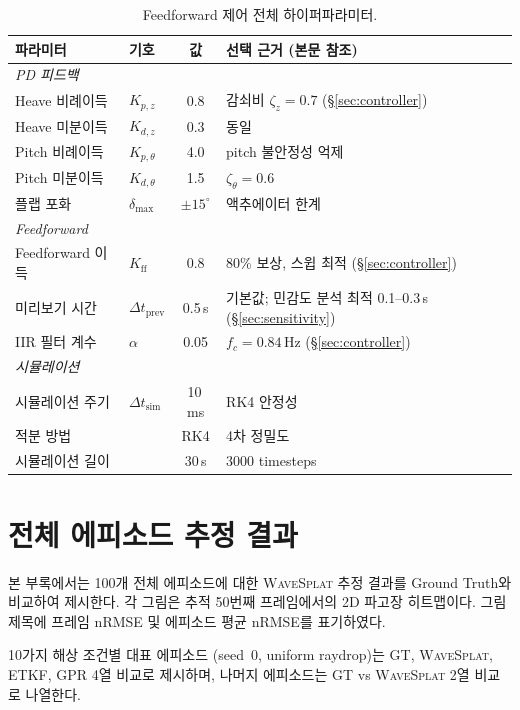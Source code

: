 \documentclass[11pt]{report}
\numberwithin{equation}{chapter}
\numberwithin{figure}{chapter}
\numberwithin{table}{chapter}
\newcommand{\WS}{\textsc{WaveSplat}}
\begin{document}
\begin{table}[htbp]
\centering
\caption{Feedforward 제어 전체 하이퍼파라미터.}
\label{tab:ff_hyperparams}
\small
\begin{tabular}{llcp{4.8cm}}
\toprule
파라미터 & 기호 & 값 & 선택 근거 (본문 참조) \\
\midrule
\multicolumn{4}{l}{\textit{PD 피드백}} \\
Heave 비례이득 & $K_{p,z}$ & 0.8 & 감쇠비 $\zeta_z=0.7$ (\S\ref{sec:controller}) \\
Heave 미분이득 & $K_{d,z}$ & 0.3 & 동일 \\
Pitch 비례이득 & $K_{p,\theta}$ & 4.0 & pitch 불안정성 억제 \\
Pitch 미분이득 & $K_{d,\theta}$ & 1.5 & $\zeta_\theta=0.6$ \\
플랩 포화 & $\delta_{\max}$ & $\pm 15^\circ$ & 액추에이터 한계 \\
\midrule
\multicolumn{4}{l}{\textit{Feedforward}} \\
Feedforward 이득 & $K_{\text{ff}}$ & 0.8 & 80\% 보상, 스윕 최적 (\S\ref{sec:controller}) \\
미리보기 시간 & $\Delta t_{\text{prev}}$ & 0.5\,s & 기본값; 민감도 분석 최적 0.1--0.3\,s (\S\ref{sec:sensitivity}) \\
IIR 필터 계수 & $\alpha$ & 0.05 & $f_c = 0.84$\,Hz (\S\ref{sec:controller}) \\
\midrule
\multicolumn{4}{l}{\textit{시뮬레이션}} \\
시뮬레이션 주기 & $\Delta t_{\text{sim}}$ & 10\,ms & RK4 안정성 \\
적분 방법 & & RK4 & 4차 정밀도 \\
시뮬레이션 길이 & & 30\,s & 3000 timesteps \\
\bottomrule
\end{tabular}
\end{table}

\chapter{전체 에피소드 추정 결과}
\label{app:episodes}

본 부록에서는 100개 전체 에피소드에 대한 \WS{} 추정 결과를
Ground Truth와 비교하여 제시한다.
각 그림은 추적 50번째 프레임에서의 2D 파고장 히트맵이다.
그림 제목에 프레임 nRMSE 및 에피소드 평균 nRMSE를 표기하였다.

10가지 해상 조건별 대표 에피소드 (seed~0, uniform raydrop)는
GT, \WS{}, ETKF, GPR 4열 비교로 제시하며,
나머지 에피소드는 GT vs \WS{} 2열 비교로 나열한다.
\end{document}
